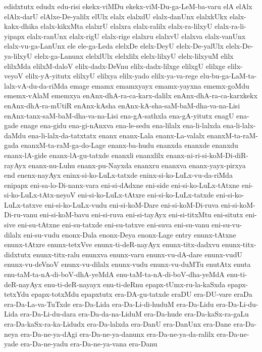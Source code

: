 {edidxtutx
edudx
edu-risi
ekekx-viMDu
ekekx-viM-Du-ga-LeM-ba-varu
elA
elAlx
elAlx-darU
elAlxe-De-yalilx
elUlx
elalx
elalxdU
elalx-danUnx
elalxkUkx
elalx-kakx-dhika
elalx-kikxMta
elalxrU
elalxra
elalx-ralilx
elalx-ra-lilxyU
elalx-ra-li-yipapx
elalx-ranUnx
elalx-rigU
elalx-rige
elalxru
elalxvU
elalxva
elalx-vanUnx
elalx-vu-ga-LanUnx
ele
ele-ga-Leda
elelxDe
elelx-DeyU
elelx-De-yalUlx
elelx-De-ya-lilxyU
elelx-ga-Lanunx
elelxlUlx
elelxlilx
elelx-lilxyU
elelx-lilxyuM
elilx
elilxMda
elilxM-daloV
elilx-dadx-DeVnu
elilx-dadx-lilxge
elilxgU
elilxge
elilx-veyoV
elilx-yA-yitutx
elilxyU
elilxya
elilx-yado
elilx-ya-va-rege
elu-bu-ga-LaM-ta-lalx-vA-du-da-riMda
emage
emamx
emamxyayx
emamx-yayxna
ememx-goMdu
ememx-vAlaM
ememxya
enAnx-dhA-ra-ca-karx-dalilx
enAnx-dhA-ra-ca-karxkekx
enAnx-dhA-ra-mUtiR
enAnx-kAsha
enAnx-kA-sha-saM-baM-dha-va-na-Lisi
enAnx-tanx-saM-baM-dha-va-na-Lisi
ena-gA-sathxla
ena-gA-yitutx
enagU
ena-gade
enage
ena-gidu
ena-gi-nAnxva
ena-le-sedu
ena-lilalx
ena-li-lalxda
ena-li-lalx-daMdu
ena-li-lalx-da-tatxtatx
enanx
enanx-Lala
enanx-La-valalx
enanxM-ta-raM-gada
enanxM-ta-raM-ga-do-Lage
enanx-ba-hudu
enanxda
enanxde
enanxdu
enanx-lA-gide
enanx-lA-gu-tatxde
enanxli
enanxlilx
enanx-ni-ri-si-koM-Di-diR-rayAyx
enanx-nu-Luhu
enanx-pu-Nayxda
enanxru
enanxva
enanx-yayx-pirxya
end
enenx-nayAyx
eninx-si-ko-LuLx-tatxde
eninx-si-ko-LuLx-vu-da-riMda
enipapx
eni-sa-lo-Di-nanx-vara
eni-si-dAdxne
eni-side
eni-si-ko-LuLx-tAtxne
eni-si-ko-LuLx-tAtx-neyoV
eni-si-ko-LuLx-tAtxre
eni-si-ko-LuLx-tatxde
eni-si-ko-LuLx-tatxve
eni-si-ko-LuLx-vudu
eni-si-koM-Dare
eni-si-koM-Di-ruva
eni-si-koM-Di-ru-vanu
eni-si-koM-bavu
eni-si-ruva
eni-si-tayAyx
eni-si-titxMtu
eni-situtx
eni-sive
eni-su-tAtxne
eni-su-tatxde
eni-su-tatxve
eni-suva
eni-su-vanu
eni-su-vu-dilalx
eni-su-vudu
enonx-Dala
enonx-Deya
enonx-Lage
entry
enunx-tAtxne
enunx-tAtxre
enunx-tetxVve
enunx-ti-deR-nayAyx
enunx-titx-dadxvu
enunx-titx-didxtutx
enunx-titx-ralu
enunxva
enunx-varu
enunx-vu-dA-dare
enunx-vudU
enunx-vu-deVnoV
enunx-vu-dilalx
enunx-vudu
enunx-vu-duMTu
enutAtx
enuta
enu-taM-ta-nA-di-boV-dhA-yeMdA
enu-taM-ta-nA-di-boV-dha-yeMdA
enu-ti-deR-nayAyx
enu-ti-deR-nayayx
enu-ti-deRnu
epapx-tUmx-ru-la-kaSxda
epapx-tetxYdu
epapx-totxMdu
epapxtutx
era-DA-gu-tatxde
eraDU
era-DU-vare
eraDa
era-Da-La-va-TuTxde
era-Da-Lida
era-Da-Li-di-huduM
era-Da-Lidu
era-Da-Li-du-Lida
era-Da-Li-du-dara
era-Da-da-na-LiduM
era-Da-hude
era-Da-kaSx-ra-gaLu
era-Da-kaSx-ra-ka-Lidudx
era-Da-lalxda
era-DanU
era-DanUnx
era-Dane
era-Da-neya
era-Da-ne-ya-dAgi
era-Da-ne-ya-danunx
era-Da-ne-ya-da-ralilx
era-Da-ne-yade
era-Da-ne-yadu
era-Da-ne-ya-vana
era-Danu
}
